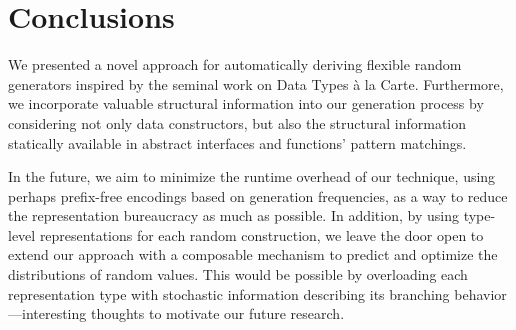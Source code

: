 \section{Conclusions}
\label{sec:conclusions}

We presented a novel approach for automatically deriving flexible random
generators inspired by the seminal work on Data Types \`a la Carte.
%
Furthermore, we incorporate valuable structural information into our generation
process by considering not only data constructors, but also the structural
information statically available in abstract interfaces and functions' pattern
matchings.
%


In the future, we aim to minimize the runtime overhead of our technique, using
perhaps prefix-free encodings based on generation frequencies, as a way to
reduce the representation bureaucracy as much as possible.
%
In addition, by using type-level representations for each random construction,
we leave the door open to extend our approach with a composable mechanism to
predict and optimize the distributions of random values.
%
This would be possible by overloading each representation type with stochastic
information describing its branching behavior---interesting thoughts to motivate
our future research.

